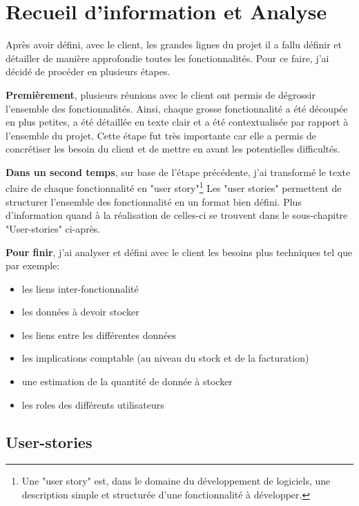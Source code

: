 \section{Recueil d'information et Analyse}

Après avoir défini, avec le client, les grandes lignes du projet il a fallu définir et détailler de manière approfondie toutes les fonctionnalités. Pour ce faire, j'ai décidé de procéder en plusieurs étapes. 

\newpara

\textbf{Premièrement}, plusieurs réunions avec le client ont permis de dégrossir l'ensemble des fonctionnalités. Ainsi, chaque grosse fonctionnalité a été découpée en plus petites, a été détaillée en texte clair et a été contextualisée par rapport à l'ensemble du projet. 
Cette étape fut très importante car elle a permis de concrétiser les besoin du client et de mettre en avant les potentielles difficultés. 

\newpara

\textbf{Dans un second temps}, sur base de l'étape précédente, j'ai transformé le texte claire de chaque fonctionnalité en "user story"\footnote{Une "user story" est, dans le domaine du développement de logiciels, une description simple et structurée d'une fonctionnalité à développer.} Les "user stories" permettent de structurer l'ensemble des fonctionnalité en un format bien défini. Plus d'information quand à la réalisation de celles-ci se trouvent dans le sous-chapitre "User-stories" ci-après. 

\newpara

\textbf{Pour finir}, j'ai analyser et défini avec le client les besoins plus techniques tel que par exemple: 
\begin{itemize}
  \item les liens inter-fonctionnalité
  \item les données à devoir stocker 
  \item les liens entre les différentes données
  \item les implications comptable (au niveau du stock et de la facturation)
  \item une estimation de la quantité de donnée à stocker
  \item les roles des différents utilisateurs
\end{itemize}


\subsection{User-stories}

